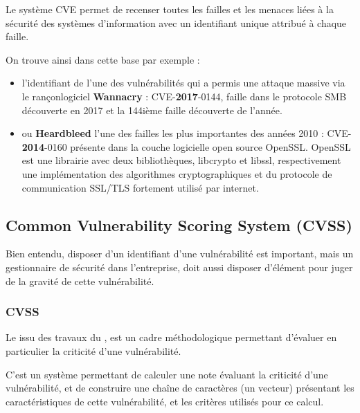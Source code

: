 Le système CVE permet de recenser toutes les failles et les menaces liées à la sécurité des systèmes d’information avec  un identifiant unique  attribué à chaque faille.

On trouve ainsi dans cette base par exemple :

\begin{itemize}
  \item l’identifiant de l’une des  vulnérabilités qui a permis une attaque massive via le rançonlogiciel \textbf{Wannacry} : CVE-\textbf{2017}-0144,  faille dans le protocole SMB découverte en 2017 et la 144ième faille découverte de l'année.
  \item ou \textbf{Heardbleed} l’une des failles les plus importantes des années 2010 : CVE-\textbf{2014}-0160 présente dans la couche logicielle open source OpenSSL. OpenSSL est une librairie avec deux bibliothèques, libcrypto et libssl,  respectivement une implémentation des algorithmes cryptographiques et du protocole de communication SSL/TLS fortement utilisé par internet.
\end{itemize}


\subsection{Common Vulnerability Scoring System (CVSS)}

Bien entendu, disposer d'un identifiant d'une vulnérabilité est important, mais  un gestionnaire de sécurité dans l'entreprise, doit aussi disposer d'élément pour juger de la gravité de cette vulnérabilité. 


\begin{frame}
\frametitle<presentation>{CVSS}
Le   issu des travaux du  , est un cadre méthodologique permettant d'évaluer en particulier la criticité d'une vulnérabilité.
\end{frame}


C'est un système permettant de calculer une note évaluant la criticité d'une vulnérabilité, et de construire une chaîne de caractères (un vecteur) présentant les caractéristiques de cette vulnérabilité, et les critères utilisés pour ce calcul.

